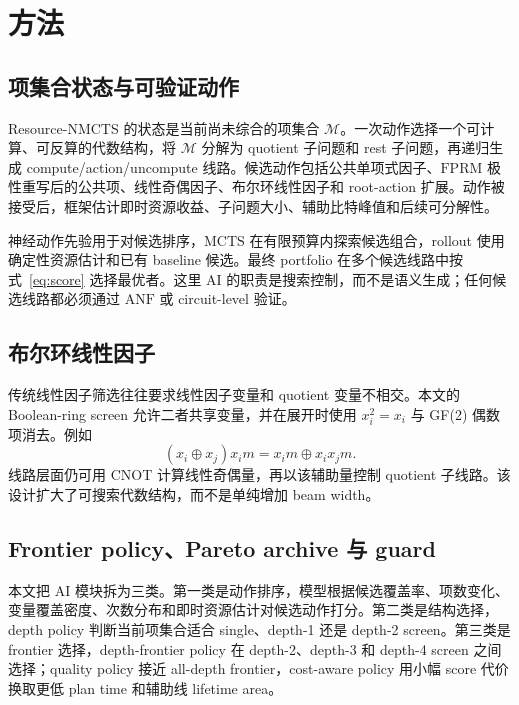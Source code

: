 \documentclass[UTF8,fontset=macnew,11pt]{ctexart}
\newcommand{\method}{Resource-NMCTS}
\newcommand{\anf}{\ensuremath{\mathrm{ANF}}}
\newcommand{\fprm}{\ensuremath{\mathrm{FPRM}}}
\newcommand{\mcts}{\ensuremath{\mathrm{MCTS}}}
\newcommand{\xor}{\ensuremath{\oplus}}
\begin{document}
\section{方法}

\subsection{项集合状态与可验证动作}

\method{} 的状态是当前尚未综合的项集合 $\mathcal{M}$。一次动作选择一个可计算、可反算的代数结构，将 $\mathcal{M}$ 分解为 quotient 子问题和 rest 子问题，再递归生成 compute/action/uncompute 线路。候选动作包括公共单项式因子、\fprm{} 极性重写后的公共项、线性奇偶因子、布尔环线性因子和 root-action 扩展。动作被接受后，框架估计即时资源收益、子问题大小、辅助比特峰值和后续可分解性。

神经动作先验用于对候选排序，\mcts{} 在有限预算内探索候选组合，rollout 使用确定性资源估计和已有 baseline 候选。最终 portfolio 在多个候选线路中按式~\eqref{eq:score} 选择最优者。这里 AI 的职责是搜索控制，而不是语义生成；任何候选线路都必须通过 \anf{} 或 circuit-level 验证。

\subsection{布尔环线性因子}

传统线性因子筛选往往要求线性因子变量和 quotient 变量不相交。本文的 Boolean-ring screen 允许二者共享变量，并在展开时使用 $x_i^2=x_i$ 与 GF(2) 偶数项消去。例如
\begin{equation}
  (x_i\xor x_j)x_i m = x_i m \xor x_i x_j m .
  \label{eq:boolean-ring}
\end{equation}
线路层面仍可用 CNOT 计算线性奇偶量，再以该辅助量控制 quotient 子线路。该设计扩大了可搜索代数结构，而不是单纯增加 beam width。

\subsection{Frontier policy、Pareto archive 与 guard}

本文把 AI 模块拆为三类。第一类是动作排序，模型根据候选覆盖率、项数变化、变量覆盖密度、次数分布和即时资源估计对候选动作打分。第二类是结构选择，depth policy 判断当前项集合适合 single、depth-1 还是 depth-2 screen。第三类是 frontier 选择，depth-frontier policy 在 depth-2、depth-3 和 depth-4 screen 之间选择；quality policy 接近 all-depth frontier，cost-aware policy 用小幅 score 代价换取更低 plan time 和辅助线 lifetime area。
\end{document}
